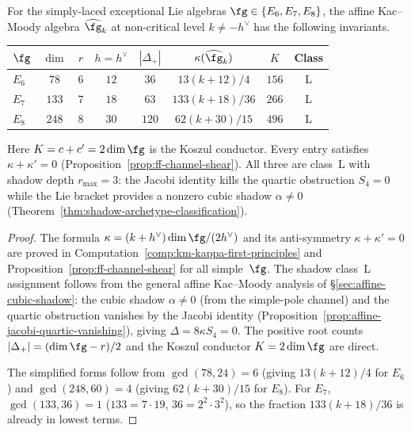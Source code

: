 \begin{proposition}%
\label{prop:exceptional-shadow-invariants}
For the simply-laced exceptional Lie algebras
$\fg \in \{E_6, E_7, E_8\}$, the affine Kac--Moody
algebra $\widehat{\fg}_k$ at non-critical level $k \neq -h^\vee$
has the following invariants.
\begin{center}
\label{tab:exceptional-shadow-data}%
\renewcommand{\arraystretch}{1.3}
\begin{tabular}{lccccccc}
\toprule
$\fg$ & $\dim$ & $r$ & $h = h^\vee$ & $|\Delta_+|$
 & $\kappa(\widehat{\fg}_k)$ & $K$ & Class \\
\midrule
$E_6$ & $78$ & $6$ & $12$ & $36$
 & $13(k+12)/4$ & $156$ & L \\
$E_7$ & $133$ & $7$ & $18$ & $63$
 & $133(k+18)/36$ & $266$ & L \\
$E_8$ & $248$ & $8$ & $30$ & $120$
 & $62(k+30)/15$ & $496$ & L \\
\bottomrule
\end{tabular}
\end{center}
Here $K = c + c' = 2\dim\fg$ is the Koszul conductor.
Every entry satisfies $\kappa + \kappa' = 0$
(Proposition~\textup{\ref{prop:ff-channel-shear}}).
All three are class~L with shadow depth $r_{\max} = 3$:
the Jacobi identity kills the quartic obstruction
$S_4 = 0$ while the Lie bracket provides a nonzero
cubic shadow $\alpha \neq 0$
(Theorem~\textup{\ref{thm:shadow-archetype-classification}}).
\end{proposition}

\begin{proof}
The formula $\kappa = (k + h^\vee)\dim\fg/(2h^\vee)$ and
its anti-symmetry $\kappa + \kappa' = 0$ are proved in
Computation~\ref{comp:km-kappa-first-principles} and
Proposition~\ref{prop:ff-channel-shear} for all simple~$\fg$.
The shadow class~L assignment follows from the general
affine Kac--Moody analysis of
\S\ref{sec:affine-cubic-shadow}: the cubic shadow
$\alpha \neq 0$ (from the simple-pole channel) and
the quartic obstruction vanishes by the Jacobi identity
(Proposition~\ref{prop:affine-jacobi-quartic-vanishing}), giving
$\Delta = 8\kappa S_4 = 0$. The positive root counts
$|\Delta_+| = (\dim\fg - r)/2$ and the Koszul conductor
$K = 2\dim\fg$ are direct.

The simplified forms follow from
$\gcd(78, 24) = 6$ (giving $13(k+12)/4$ for $E_6$)
and $\gcd(248, 60) = 4$ (giving $62(k+30)/15$ for $E_8$).
For $E_7$, $\gcd(133, 36) = 1$ ($133 = 7 \cdot 19$, $36 = 2^2 \cdot 3^2$),
so the fraction $133(k+18)/36$ is already in lowest terms.
\end{proof}

